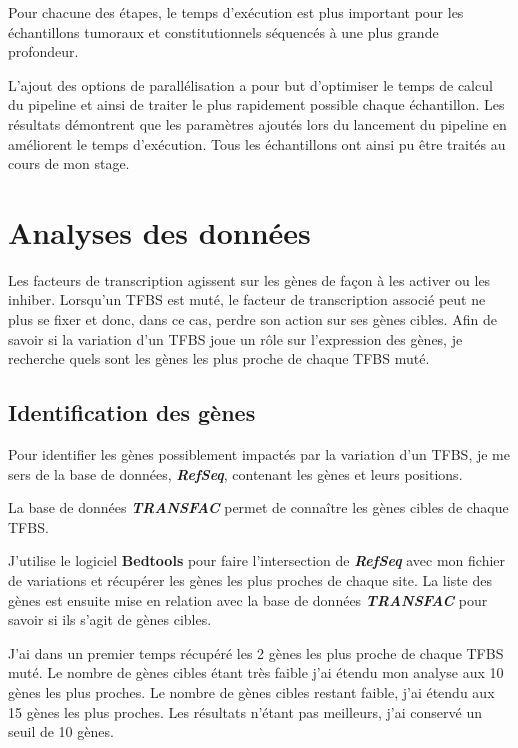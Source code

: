 Pour chacune des étapes, le temps d'exécution est plus important pour les échantillons tumoraux et constitutionnels séquencés à une plus grande profondeur.  

L'ajout des options de parallélisation a pour but d'optimiser le temps de calcul du pipeline et ainsi de traiter le plus rapidement possible chaque échantillon. Les résultats démontrent que les paramètres ajoutés lors du lancement du pipeline en améliorent le temps d'exécution. Tous les échantillons ont ainsi pu être traités au cours de mon stage.

\section{Analyses des données}

Les facteurs de transcription agissent sur les gènes de façon à les activer ou les inhiber. Lorsqu'un TFBS est muté, le facteur de transcription associé peut ne plus se fixer et donc, dans ce cas, perdre son action sur ses gènes cibles. Afin de savoir si la variation d'un TFBS joue un rôle sur l'expression des gènes, je recherche quels sont les gènes les plus proche de chaque TFBS muté. 

\subsection{Identification des gènes}\label{subsec:identification}

Pour identifier les gènes possiblement impactés par la variation d'un TFBS, je me sers de la base de données, \textit{\textbf{RefSeq}}, contenant les gènes et leurs positions.

La base de données \textit{\textbf{TRANSFAC}} permet de connaître les gènes cibles de chaque TFBS.

J'utilise le logiciel \textbf{Bedtools} pour faire l'intersection de \textit{\textbf{RefSeq}} avec mon fichier de variations et récupérer les gènes les plus proches de chaque site. La liste des gènes est ensuite mise en relation avec la base de données \textit{\textbf{TRANSFAC}} pour savoir si ils s'agit de gènes cibles.

J'ai dans un premier temps récupéré les 2 gènes les plus proche de chaque TFBS muté. Le nombre de gènes cibles étant très faible j'ai étendu mon analyse aux 10 gènes les plus proches. Le nombre de gènes cibles restant faible, j'ai étendu aux 15 gènes les plus proches. Les résultats n'étant pas meilleurs, j'ai conservé un seuil de 10 gènes.  

